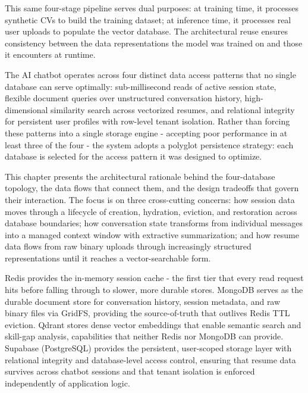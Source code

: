 \documentclass[12pt, a4paper]{report}
\begin{document}
This same four-stage pipeline serves dual purposes: at training time, it processes synthetic CVs to build the training dataset; at inference time, it processes real user uploads to populate the vector database. The architectural reuse ensures consistency between the data representations the model was trained on and those it encounters at runtime.

\vspace{0.8cm}
\vspace{0.4cm}

\vspace{0.4cm}

The AI chatbot operates across four distinct data access patterns that no single database can serve optimally: sub-millisecond reads of active session state, flexible document queries over unstructured conversation history, high-dimensional similarity search across vectorized resumes, and relational integrity for persistent user profiles with row-level tenant isolation. Rather than forcing these patterns into a single storage engine - accepting poor performance in at least three of the four - the system adopts a polyglot persistence strategy: each database is selected for the access pattern it was designed to optimize.

This chapter presents the architectural rationale behind the four-database topology, the data flows that connect them, and the design tradeoffs that govern their interaction. The focus is on three cross-cutting concerns: how session data moves through a lifecycle of creation, hydration, eviction, and restoration across database boundaries; how conversation state transforms from individual messages into a managed context window with extractive summarization; and how resume data flows from raw binary uploads through increasingly structured representations until it reaches a vector-searchable form.

Redis provides the in-memory session cache - the first tier that every read request hits before falling through to slower, more durable stores. MongoDB serves as the durable document store for conversation history, session metadata, and raw binary files via GridFS, providing the source-of-truth that outlives Redis TTL eviction. Qdrant stores dense vector embeddings that enable semantic search and skill-gap analysis, capabilities that neither Redis nor MongoDB can provide. Supabase (PostgreSQL) provides the persistent, user-scoped storage layer with relational integrity and database-level access control, ensuring that resume data survives across chatbot sessions and that tenant isolation is enforced independently of application logic.
\end{document}
